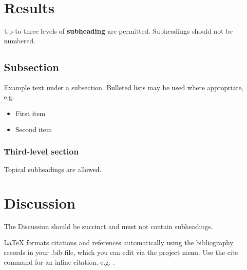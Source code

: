 \documentclass[fleqn,10pt]{wlscirep}
\begin{document}

\section*{Results}

Up to three levels of \textbf{subheading} are permitted. Subheadings should not be numbered.

\subsection*{Subsection}

Example text under a subsection. Bulleted lists may be used where appropriate, e.g.

\begin{itemize}
\item First item
\item Second item
\end{itemize}

\subsubsection*{Third-level section}
 
Topical subheadings are allowed.

\section*{Discussion}

The Discussion should be succinct and must not contain subheadings.

\printbibliography



\noindent LaTeX formats citations and references automatically using the bibliography records in your .bib file, which you can edit via the project menu. Use the cite command for an inline citation, e.g.  \cite{Hao:gidmaps:2014}.
\end{document}
